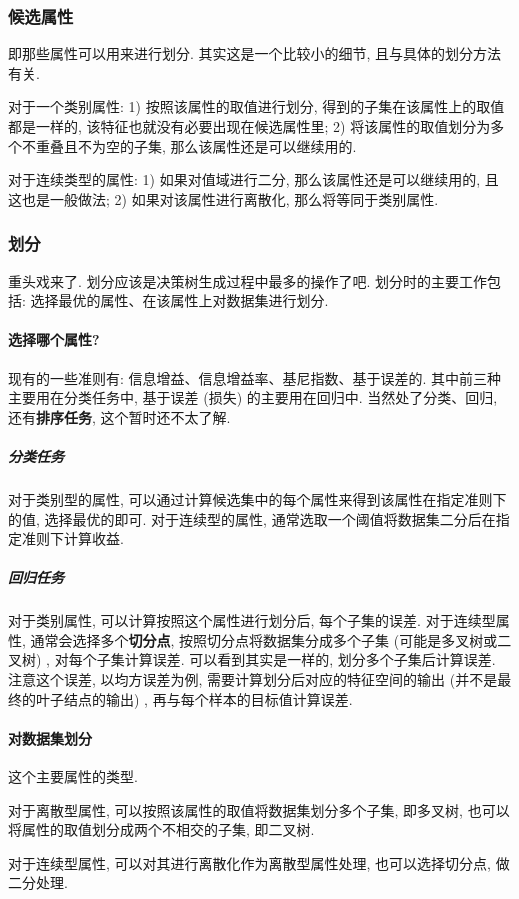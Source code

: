 \subsubsection{候选属性}
即那些属性可以用来进行划分. 其实这是一个比较小的细节, 且与具体的划分方法有关. 

对于一个类别属性: 1) 按照该属性的取值进行划分, 得到的子集在该属性上的取值都是一样的, 该特征也就没有必要出现在候选属性里; 2) 将该属性的取值划分为多个不重叠且不为空的子集, 那么该属性还是可以继续用的.

对于连续类型的属性: 1) 如果对值域进行二分, 那么该属性还是可以继续用的, 且这也是一般做法; 2) 如果对该属性进行离散化, 那么将等同于类别属性.

\subsubsection{划分}
重头戏来了. 划分应该是决策树生成过程中最多的操作了吧. 划分时的主要工作包括: 选择最优的属性、在该属性上对数据集进行划分. 

\paragraph{选择哪个属性?}
现有的一些准则有: 信息增益、信息增益率、基尼指数、基于误差的. 其中前三种主要用在分类任务中, 基于误差 (损失) 的主要用在回归中. 当然处了分类、回归, 还有\textbf{排序任务}, 这个暂时还不太了解. 

\subparagraph{分类任务}
对于类别型的属性, 可以通过计算候选集中的每个属性来得到该属性在指定准则下的值, 选择最优的即可. 对于连续型的属性, 通常选取一个阈值将数据集二分后在指定准则下计算收益. 

\subparagraph{回归任务}
对于类别属性, 可以计算按照这个属性进行划分后, 每个子集的误差. 对于连续型属性, 通常会选择多个\textbf{切分点}, 按照切分点将数据集分成多个子集 (可能是多叉树或二叉树) , 对每个子集计算误差. 可以看到其实是一样的, 划分多个子集后计算误差. 注意这个误差, 以均方误差为例, 需要计算划分后对应的特征空间的输出 (并不是最终的叶子结点的输出) , 再与每个样本的目标值计算误差. 

\paragraph{对数据集划分}
这个主要属性的类型. 

对于离散型属性, 可以按照该属性的取值将数据集划分多个子集, 即多叉树, 也可以将属性的取值划分成两个不相交的子集, 即二叉树. 

对于连续型属性, 可以对其进行离散化作为离散型属性处理, 也可以选择切分点, 做二分处理. 

